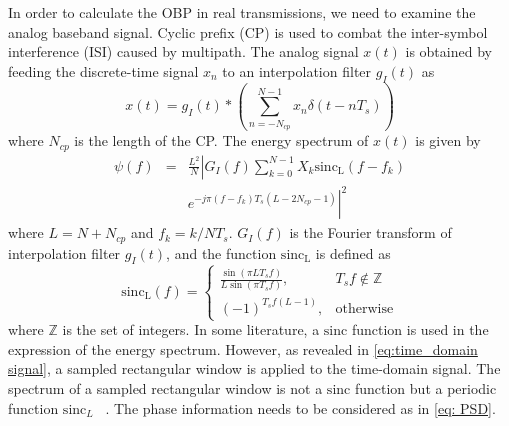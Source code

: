 \documentclass[paper]{ieice}
\begin{document}
In order to calculate the OBP in real transmissions, we need to examine the analog baseband signal. Cyclic prefix (CP) is used to combat the inter-symbol interference (ISI) caused by multipath. The analog signal $x(t)$ is obtained by feeding the discrete-time signal $x_{n}$ to an interpolation filter $g_I(t)$ as
\begin{equation}
x(t) = g_I(t) * \left(\sum_{n=-N_{cp}}^{N-1}x_{n}\delta(t-nT_s) \right) \label{eq:time_domain signal}
\end{equation}
where $N_{cp}$ is the length of the CP. The energy spectrum of $x(t)$ is given by
\begin{eqnarray} \label{eq:spd}
\psi(f) &=& \frac{L^2}{N}\left|G_I(f)\sum_{k=0}^{N-1}X_k \mathrm{sinc_L}(f-f_k)\right. \nonumber\\
&&\left.e^{-j\pi(f - f_k)T_s(L - 2N_{cp} -1)}\right|^2 \label{eq: PSD}
\end{eqnarray}
where $L = N + N_{cp}$ and $f_{k} = k/NT_s$. $G_I(f)$ is the Fourier transform of interpolation filter $g_I(t)$, and the function $\mathrm{sinc_L}$ is defined as 
\begin{equation}
\mathrm{sinc_L}(f) = \left\{\begin{array}{cc}
\frac{\sin(\pi LT_s f)}{L\sin(\pi T_s f)}, & T_s f \notin \mathbb{Z}\\
(-1)^{T_sf(L-1)}, & \mathrm{otherwise}
\end{array}\right. \label{eq:sinc_M}
\end{equation}
where $\mathbb{Z}$ is the set of integers. In some literature, a $\mathrm{sinc}$ function is used in the expression of the energy spectrum. However, as revealed in \eqref{eq:time_domain signal}, a sampled rectangular window is applied to the time-domain signal.  The spectrum of a sampled rectangular window is not a $\mathrm{sinc}$ function but a periodic function $\mathrm{sinc}_L$ ~\cite{harris1978use,Analytical_Spectrum,Gert_DMT}.  The phase information needs to be considered as in \eqref{eq: PSD}.
  
\end{document}
